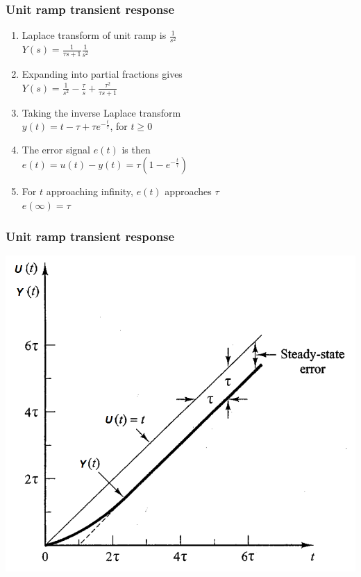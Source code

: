 \begin{frame}
\frametitle{Unit ramp transient response}
\begin{enumerate}
\vspace{0.25cm}
\item Laplace transform of unit ramp is $\frac{1}{s^2}$
\vspace{0.25cm}
\\ $Y(s) = \frac{1}{\tau s +1} \frac{1}{s^2}$
\vspace{0.25cm}
\pause
\item Expanding into partial fractions gives
\vspace{0.25cm}
\\ $Y(s)= \frac{1}{s^2} - \frac{\tau}{s} + \frac{\tau^2}{\tau s +1}$
\vspace{0.25cm}
\pause
\item Taking the inverse Laplace transform 
\vspace{0.25cm}
\\ $y(t) = t -\tau + \tau e^{-\frac{t}{\tau}}$, for $t\ge 0$
\vspace{0.25cm}
\pause
\item The error signal $e(t)$ is then
\vspace{0.25cm}
\\ $e(t)=u(t) -y(t) = \tau(1-e^{-\frac{t}{\tau}})$
\vspace{0.25cm}
\pause
\item For $t$ approaching infinity, $e(t)$ approaches $\tau$
\vspace{0.25cm}
\\ $e(\infty) = \tau$
\end {enumerate}
\end{frame}

\begin{frame}
\frametitle{Unit ramp transient response}
\includegraphics[width=0.8\linewidth]{Afbeelding4}
\end{frame}

